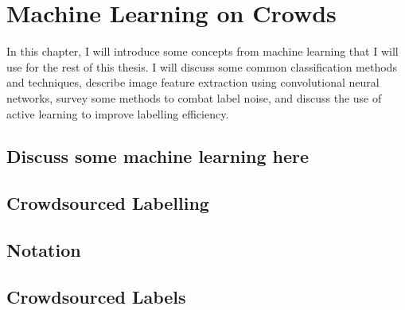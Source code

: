 \chapter{Machine Learning on Crowds}

 In this chapter, I will introduce some
concepts from machine learning that I will use for the rest of this thesis. I
will discuss some common classification methods and techniques, describe image
feature extraction using convolutional neural networks, survey some methods to
combat label noise, and discuss the use of active learning to improve labelling
efficiency.

\section{Discuss some machine learning here}

\section{Crowdsourced Labelling}

    \section{Notation}


    \section{Crowdsourced Labels}
        
